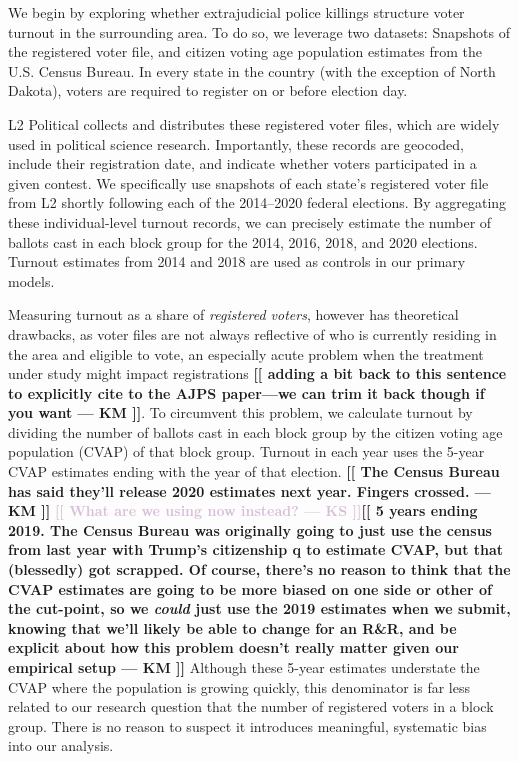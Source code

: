 \documentclass[12pt]{article}
\newcommand{\kscomment}[1]{\textbf{\textcolor{Thistle}{[[ #1 --- KS ]]}}}
\newcommand{\kmcomment}[1]{\textbf{\textcolor{JungleGreen}{[[ #1 --- KM ]]}}}
\begin{document}
We begin by exploring whether extrajudicial police killings structure voter turnout in the surrounding area. To do so, we leverage two datasets: Snapshots of the registered voter file, and citizen voting age population estimates from the U.S. Census Bureau. In every state in the country (with the exception of North Dakota), voters are required to register on or before election day. 

L2 Political collects and distributes these registered voter files, which are widely used in political science research. Importantly, these records are geocoded, include their registration date, and indicate whether voters participated in a given contest. We specifically use snapshots of each state's registered voter file from L2 shortly following each of the 2014--2020 federal elections. By aggregating these individual-level turnout records, we can precisely estimate the number of ballots cast in each block group for the 2014, 2016, 2018, and 2020 elections. Turnout estimates from 2014 and 2018 are used as controls in our primary models.

Measuring turnout as a share of \textit{registered voters}, however has theoretical drawbacks, as voter files are not always reflective of who is currently residing in the area and eligible to vote, an especially acute problem when the treatment under study might impact registrations \citep[see][]{Nyhan2017}\kmcomment{adding a bit back to this sentence to explicitly cite to the AJPS paper---we can trim it back though if you want}. To circumvent this problem, we calculate turnout by dividing the number of ballots cast in each block group by the citizen voting age population (CVAP) of that block group. Turnout in each year uses the 5-year CVAP estimates ending with the year of that election. \kmcomment{The Census Bureau has said they'll release 2020 estimates next year. Fingers crossed.} \kscomment{What are we using now instead?}\kmcomment{5 years ending 2019. The Census Bureau was originally going to just use the census from last year with Trump's citizenship q to estimate CVAP, but that (blessedly) got scrapped. Of course, there's no reason to think that the CVAP estimates are going to be more biased on one side or other of the cut-point, so we \textit{could} just use the 2019 estimates when we submit, knowing that we'll likely be able to change for an R\&R, and be explicit about how this problem doesn't really matter given our empirical setup} Although these 5-year estimates understate the CVAP where the population is growing quickly, this denominator is far less related to our research question that the number of registered voters in a block group. There is no reason to suspect it introduces meaningful, systematic bias into our analysis.
\end{document}
